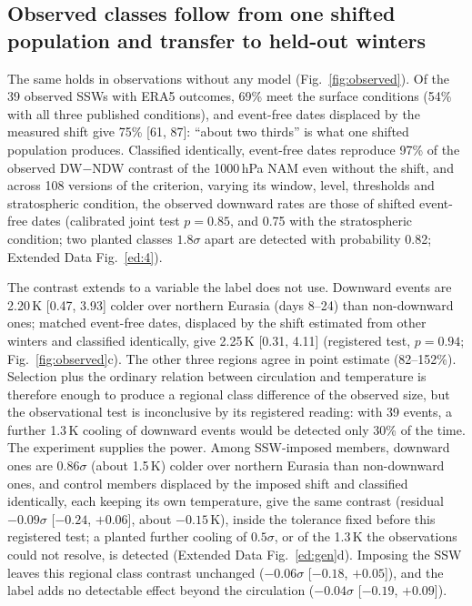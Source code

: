\documentclass[11pt]{article}
\begin{document}
\subsection*{Observed classes follow from one shifted population and transfer to held-out winters}

The same holds in observations without any model (Fig.~\ref{fig:observed}). Of the 39 observed SSWs with ERA5 outcomes, 69\% meet the surface conditions (54\% with all three published conditions), and event-free dates displaced by the measured shift give 75\% [61, 87]: ``about two thirds'' is what one shifted population produces. Classified identically, event-free dates reproduce 97\% of the observed DW$-$NDW contrast of the 1000\,hPa NAM even without the shift, and across 108 versions of the criterion, varying its window, level, thresholds and stratospheric condition, the observed downward rates are those of shifted event-free dates (calibrated joint test $p = 0.85$, and 0.75 with the stratospheric condition; two planted classes $1.8\sigma$ apart are detected with probability 0.82; Extended Data Fig.~\ref{ed:4}).

The contrast extends to a variable the label does not use. Downward events are 2.20\,K [0.47, 3.93] colder over northern Eurasia (days 8--24) than non-downward ones; matched event-free dates, displaced by the shift estimated from other winters and classified identically, give 2.25\,K [0.31, 4.11] (registered test, $p = 0.94$; Fig.~\ref{fig:observed}c). The other three regions agree in point estimate (82--152\%). Selection plus the ordinary relation between circulation and temperature is therefore enough to produce a regional class difference of the observed size, but the observational test is inconclusive by its registered reading: with 39 events, a further 1.3\,K cooling of downward events would be detected only 30\% of the time. The experiment supplies the power. Among SSW-imposed members, downward ones are $0.86\sigma$ (about 1.5\,K) colder over northern Eurasia than non-downward ones, and control members displaced by the imposed shift and classified identically, each keeping its own temperature, give the same contrast (residual $-0.09\sigma$ [$-0.24$, $+0.06$], about $-0.15$\,K), inside the tolerance fixed before this registered test; a planted further cooling of $0.5\sigma$, or of the 1.3\,K the observations could not resolve, is detected (Extended Data Fig.~\ref{ed:gen}d). Imposing the SSW leaves this regional class contrast unchanged ($-0.06\sigma$ [$-0.18$, $+0.05$]), and the label adds no detectable effect beyond the circulation ($-0.04\sigma$ [$-0.19$, $+0.09$]).
\end{document}
